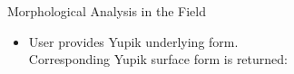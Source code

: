 \documentclass[usenames,dvipsnames]{beamer}
\begin{document}
\begin{frame}[fragile]
\begin{columns}[T]
\begin{column}{0.29\textwidth}
\begin{block}{Morphological Analysis in the Field}
\begin{itemize}
\vspace{24pt}

\item User provides Yupik underlying form. \\ Corresponding Yupik surface form is returned:

\vspace{9pt}


\end{itemize}

\end{block}
\end{column}
\end{columns}

\end{frame}
\end{document}
